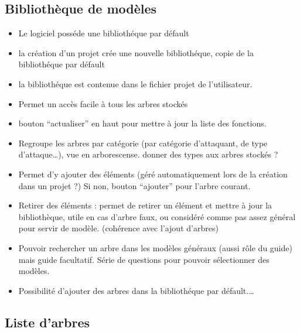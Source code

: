 	\subsection{Bibliothèque de modèles}

		\begin{itemize}
			\item Le logiciel posséde une bibliothéque par défault
			\item la création d'un projet crée une nouvelle bibliothéque, copie de la bibliothéque par défault
			\item la bibliothéque est contenue dans le fichier projet de l'utilisateur. 
			\item Permet un accès facile à tous les arbres stockés
			\item bouton “actualiser” en haut pour mettre à jour la liste des fonctions.
			\item Regroupe les arbres par catégorie (par catégorie d’attaquant, de type d’attaque…), vue en arborescense. 	donner des types aux arbres stockés ?
			\item Permet d’y ajouter des éléments (géré automatiquement lors de la création dans un projet ?) Si non, bouton “ajouter” pour l’arbre courant. 
			\item Retirer des éléments : permet de retirer un élément et mettre à jour la bibliothèque, utile en cas d’arbre faux, ou considéré comme pas assez général pour servir de modèle. (cohérence avec l’ajout d’arbres)
			\item Pouvoir rechercher un arbre dans les modèles généraux (aussi rôle du guide) mais guide facultatif. Série de questions pour pouvoir sélectionner des modèles.
			\item Possibilité d'ajouter des arbres dans la bibliothéque par défault.\ldots
		\end{itemize}
		


	\subsection{Liste d'arbres}



